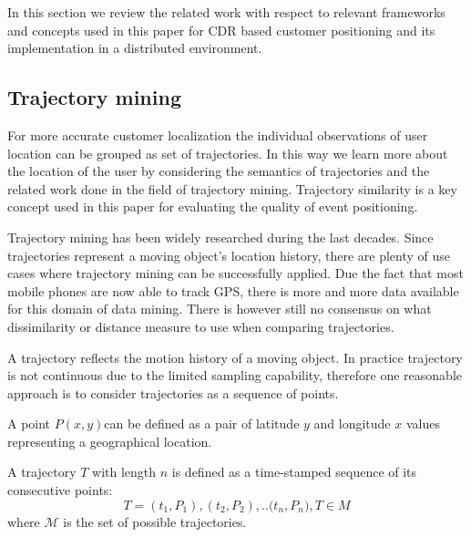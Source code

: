 In this section we review the related work with respect to relevant frameworks and concepts used in this paper for CDR based customer positioning and its implementation in a distributed environment.

\subsection{Trajectory mining}
For more accurate customer localization the individual observations of user location can be grouped as set of trajectories. In this way we learn more about the location of the user by considering the semantics of trajectories and the related work done in the field of trajectory mining. Trajectory similarity is a key concept used in this paper for evaluating the quality of event positioning.

Trajectory mining has been widely researched during the last decades. Since trajectories represent a moving object's location history, there are plenty of use cases where trajectory mining can be successfully applied.  Due the fact that most mobile phones are now able to track GPS, there is more and more data available for this domain of data mining. There is however still no consensus on what dissimilarity or distance measure to use when comparing trajectories.

A trajectory reflects the motion history of a moving object. In practice trajectory is not continuous due to the limited sampling capability, therefore one reasonable approach is to consider trajectories as a sequence of points.

\begin{definition}
A point $P(x,y)$can be defined as a pair of latitude $y$ and longitude $x$ values representing a geographical location.
\end{definition}

\begin{definition}
A trajectory $T$ with length $n$ is defined as a time-stamped sequence of its consecutive points: \[T={(t_{1},P_{1}), (t_{2},P_{2}), .. (t_{n},P_{n}}), T \in M\]
where $\mathcal{M}$ is the set of possible trajectories.
\end{definition}

